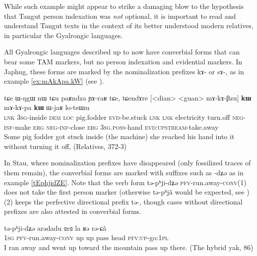 \documentclass[oldfontcommands,oneside,a4paper,11pt]{article}
\newcommand{\ipa}[1]{{\phon \mbox{#1}}} %
\begin{document}
While such example might appear to strike a damaging blow to the hypothesis that Tangut person indexation was \textit{not} optional, it is important to read and understand Tangut texts in the context of its better understood modern relatives, in particular the Gyalrongic languages.


All Gyalrongic languages described up to now have converbial forms that can bear some TAM markers, but no person indexation and evidential markers. In Japhug, these forms are   marked by the nominalization prefixes \ipa{kɤ-} or \ipa{sɤ-}, as in example \ref{ex:mAkApa.kW} (see \citealt{jacques14linking}).

\begin{exe}
\ex \label{ex:mAkApa.kW}
\gll
\ipa{tɕe}   	\ipa{ɯ-ŋgɯ}   	\ipa{nɯ} \ipa{tɕu}   	\ipa{paʁndza}   	\ipa{ɲɤ-raʁ}   	\ipa{tɕe,}   	\ipa{tɕendɤre}   	[<dian>   	<guan>   	\ipa{mɤ-kɤ-βzu}] 	\ipa{\textbf{kɯ}}   	\ipa{mɤ-kɤ-pa}   	\ipa{\textbf{kɯ}}   	\ipa{ɯ-jaʁ}   	\ipa{lo-tsɯm}   \\
\textsc{lnk} \textsc{3sg}-inside \textsc{dem} \textsc{loc} pig.fodder \textsc{evd}-be.stuck \textsc{lnk}
\textsc{lnk} electricity turn.off \textsc{neg-inf}-make \textsc{erg}  \textsc{neg-inf}-close \textsc{erg}  \textsc{3sg.poss}-hand \textsc{evd:upstream}-take.away \\
\glt Some pig fodder got stuck inside (the machine) she reached his hand into it without turning it off, (Relatives, 372-3)
\end{exe} 

In Stau, where nominalization prefixes have disappeared (only  fossilized traces of them remain), the converbial forms are marked with suffixes such as \ipa{-dʑə} as in example \ref{tEphjidZE}. Note that the verb form \ipa{tə-pʰji-dʑə} \textsc{pfv}-run.away-\textsc{conv}(1) does not take the first person marker (otherwise \ipa{tə-pʰjã} would be expected, see \citealt{jacques14rtau}) (2) keeps the perfective directional prefix \ipa{tə-}, though cases without directional prefixes are also attested in converbial forms.

\begin{exe}
\ex \label{tEphjidZE}
\gll \ipa{ŋa} 	\ipa{tə-pʰji-dʑə} 	\ipa{arədadu} 	\ipa{ɞrɞ} 	\ipa{la} 	\ipa{ʁə} 	\ipa{rə-ɕã} \\
 \textsc{1sg} \textsc{pfv}-run.away-\textsc{conv} up up pass head \textsc{pfv:up}-go:\textsc{1pl} \\
\glt I ran away and went up toward the mountain pass up there. (The hybrid yak, 86) 
\end{exe}
\end{document}
